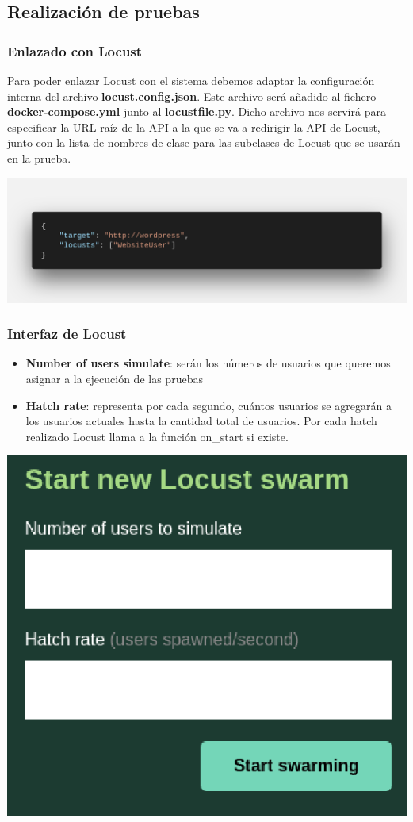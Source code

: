 \documentclass{beamer}
\theoremstyle{plain}
\theoremstyle{definition}
\theoremstyle{plain}
\theoremstyle{definition}
\theoremstyle{remark}
\theoremstyle{definition}
\begin{document}
\subsection{Realización de pruebas}
\begin{frame}
	\frametitle{Enlazado con Locust}
	Para poder enlazar Locust con el sistema debemos adaptar la configuración interna del archivo \textbf{locust.config.json}. Este archivo será añadido al fichero \textbf{docker-compose.yml} junto al \textbf{locustfile.py}.
	Dicho archivo nos servirá para especificar la URL raíz de la API a la que se va a redirigir la API de Locust, junto con la lista de nombres de clase para las subclases de Locust que se usarán en la prueba.

	\centering
	\includegraphics[scale=0.15]{imagenes/jsonLocust.png}
	\end{frame}
\begin{frame}
\frametitle{Interfaz de Locust}
\begin{itemize}			
	\item \textbf{Number of users simulate}: serán los números de usuarios que queremos asignar a la ejecución de las pruebas
	\item \textbf{Hatch rate}: representa por cada segundo, cuántos usuarios se agregarán a los usuarios actuales hasta la cantidad total de usuarios. Por cada hatch realizado Locust llama a la función on\_start si existe.
\end{itemize}
	
	\centering
	\includegraphics[scale=0.15]{imagenes/locustInterfaz.png}
\end{frame}
\end{document}
